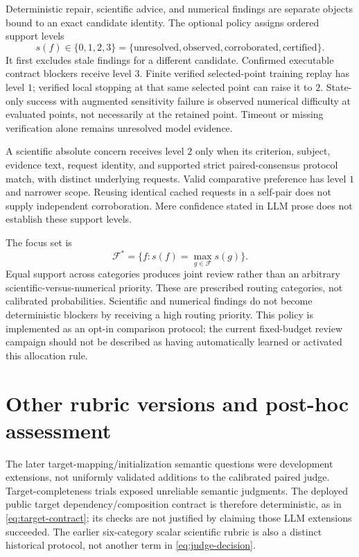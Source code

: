 \documentclass[11pt]{article}
\begin{document}
Deterministic repair, scientific advice, and numerical findings are separate
objects bound to an exact candidate identity. The optional
 policy assigns ordered support levels
\begin{equation}
 s(f)\in\{0,1,2,3\}
 =\{\text{unresolved},\text{observed},\text{corroborated},\text{certified}\}.
\end{equation}
It first excludes stale findings for a different candidate. Confirmed executable
contract blockers receive level $3$. Finite verified selected-point training
replay has level $1$; verified local stopping at that same selected point can raise
it to $2$. State-only success with augmented sensitivity failure is observed
numerical difficulty at evaluated points, not necessarily at the retained point.
Timeout or missing verification alone remains unresolved model evidence.

A scientific absolute concern receives level $2$ only when its criterion,
subject, evidence text, request identity, and supported strict paired-consensus
protocol match, with distinct underlying requests. Valid comparative preference
has level $1$ and narrower scope. Reusing identical cached requests in a self-pair
does not supply independent corroboration. Mere confidence stated in LLM prose
does not establish these support levels.

The focus set is
\begin{equation}
 \mathcal F^*=\{f:s(f)=\max_{g\in\mathcal F}s(g)\}.
\end{equation}
Equal support across categories produces joint review rather than an arbitrary
scientific-versus-numerical priority. These are prescribed routing categories,
not calibrated probabilities. Scientific and numerical findings do not become
deterministic blockers by receiving a high routing priority. This policy is
implemented as an opt-in comparison protocol; the current fixed-budget review
campaign should not be described as having automatically learned or activated
this allocation rule.

\section{Other rubric versions and post-hoc assessment}
\label{sec:posthoc}

The later target-mapping/initialization semantic questions were development
extensions, not uniformly validated additions to the calibrated paired judge.
Target-completeness trials exposed unreliable semantic judgments. The deployed
public target dependency/composition contract is therefore deterministic, as in
\eqref{eq:target-contract}; its checks are not justified by claiming those LLM
extensions succeeded. The earlier six-category scalar scientific rubric is also
a distinct historical protocol, not another term in \eqref{eq:judge-decision}.
\end{document}
